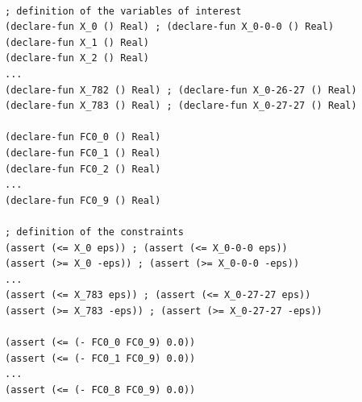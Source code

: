 \begin{lstlisting}
	
; definition of the variables of interest
(declare-fun X_0 () Real) ; (declare-fun X_0-0-0 () Real)
(declare-fun X_1 () Real)
(declare-fun X_2 () Real)
...
(declare-fun X_782 () Real) ; (declare-fun X_0-26-27 () Real)
(declare-fun X_783 () Real) ; (declare-fun X_0-27-27 () Real)

(declare-fun FC0_0 () Real)
(declare-fun FC0_1 () Real)
(declare-fun FC0_2 () Real)
...
(declare-fun FC0_9 () Real)

; definition of the constraints
(assert (<= X_0 eps)) ; (assert (<= X_0-0-0 eps))
(assert (>= X_0 -eps)) ; (assert (>= X_0-0-0 -eps))
...
(assert (<= X_783 eps)) ; (assert (<= X_0-27-27 eps))
(assert (>= X_783 -eps)) ; (assert (>= X_0-27-27 -eps))

(assert (<= (- FC0_0 FC0_9) 0.0))
(assert (<= (- FC0_1 FC0_9) 0.0))
...
(assert (<= (- FC0_8 FC0_9) 0.0))
\end{lstlisting}